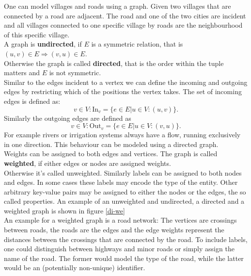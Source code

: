             One can model villages and roads using a graph. 
            Given two villages that are connected by a road are adjacent. 
            The road and one of the two cities are incident and all villages connected to one specific village by roads are the neighbourhood of this specific village. \\
            
            A graph is \textbf{undirected}, if $E$ is a symmetric relation, that is $(u, v) \in E \Rightarrow (v, u) \in E$. \\
            Otherwise the graph is called \textbf{directed}, that is the order within the tuple matters and $E$ is not symmetric. \\
            
            Similar to the edges incident to a vertex we can define the incoming and outgoing edges by restricting which of the positions the vertex takes. 
            The set of incoming edges is defined as:
            \[v \in V: \text{In}_v = \{e \in E |u \in V: (u, v) \}.\]
            Similarly the outgoing edges are defined as \[v \in V: \text{Out}_v = \{e \in E |u \in V: (v, u) \}.\]
            For example rivers or irrigation systems always have a flow, running exclusively in one direction. 
            This behaviour can be modeled using a directed graph.\\
            
            Weights can be assigned to both edges and vertices. The graph is called \textbf{weighted}, if either edges or nodes are assigned weights. \\
            Otherwise it's called unweighted.
            Similarly labels can be assigned to both nodes and edges. 
            In some cases these labels may encode the type of the entity.
            Other arbitrary key-value pairs may be assigned to either the nodes or the edges, the so called properties. An example of an unweighted and undirected, a directed and a weighted graph is shown in figure \ref{di-we} \\
            
            An example for a weighted graph is a road network: 
            The vertices are crossings between roads, the roads are the edges and the edge weights represent the distances between the crossings that are connected by the road.
            To include labels, one could distinguish between highways and minor roads or simply assign the name of the road. 
            The former would model the type of the road, while the latter would be an (potentially non-unique) identifier.\\
            
